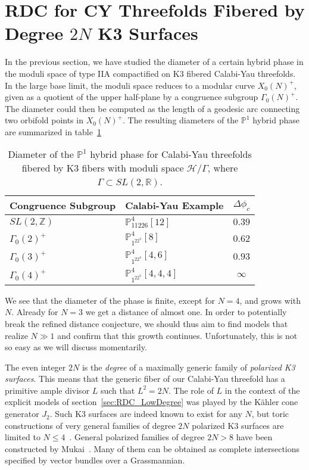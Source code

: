 \documentclass[11pt,a4paper]{article}
\numberwithin{equation}{section}
\numberwithin{table}{section}\setlength{\multlinegap}{25pt}
\begin{document}
\section{RDC for CY Threefolds Fibered by Degree \texorpdfstring{$2N$}{2N} K3 Surfaces}
\label{sec:PolarizedK3Fibrations}

In the previous section, we have studied the diameter of a certain hybrid phase in the moduli space of type IIA compactified on K3 fibered Calabi-Yau threefolds. In the large base limit, the moduli space reduces to a modular curve $X_0(N)^+$, given as a quotient of the upper half-plane by a congruence subgroup $\Gamma_0(N)^+$. The diameter could then be computed as the length of a geodesic arc connecting two orbifold points in $X_0(N)^+$. The resulting diameters of the $\mathbb{P}^1$ hybrid phase are summarized in table~\ref{tab:FiniteDistances1to4}
\begin{table}
    \renewcommand{\arraystretch}{1.3}
    \centering
    \begin{tabular}{llc}
        \toprule
        Congruence Subgroup & Calabi-Yau Example & $\Delta\phi_c$\\
        \midrule
        $SL(2,\mathbb{Z})$ & $\mathbb{P}^4_{11226}[12]$ & $0.39$\\
        $\Gamma_0(2)^+$ & $\mathbb{P}^4_{1^22^3}[8]$ & $0.62$\\
        $\Gamma_0(3)^+$ & $\mathbb{P}^4_{1^22^4}[4,6]$ & $0.93$\\
        $\Gamma_0(4)^+$ & $\mathbb{P}^4_{1^22^5}[4,4,4]$ & $\infty$\\
        \bottomrule
    \end{tabular}
    \caption{Diameter of the $\mathbb{P}^1$ hybrid phase for Calabi-Yau threefolds fibered by K3 fibers with moduli space $\mathcal{H}/\Gamma$, where $\Gamma\subset SL(2,\mathbb{R})$.}
    \label{tab:FiniteDistances1to4}
\end{table}
We see that the diameter of the phase is finite, except for $N=4$, and grows with $N$. Already for $N=3$ we get a distance of almost one. In order to potentially break the refined distance conjecture, we should thus aim to find models that realize $N\gg 1$ and confirm that this growth continues. Unfortunately, this is not so easy as we will discuss momentarily.

The even integer $2N$ is the \emph{degree} of a maximally generic family of \emph{polarized K3 surfaces}. This means that the generic fiber of our Calabi-Yau threefold has a primitive ample divisor $L$ such that $L^2=2N$. The role of $L$ in the context of the explicit models of section~\ref{sec:RDC_LowDegree} was played by the Kähler cone generator $J_2$. Such K3 surfaces are indeed known to exist for any $N$, but toric constructions of very general families of degree $2N$ polarized K3 surfaces are limited to $N\leq 4$~\cite{Huybrechts:2016uxh}. General polarized families of degree $2N>8$ have been constructed by Mukai~\cite{Mukai1,Mukai2,Mukai3,Mukai4,Mukai5,Mukai6}. Many of them can be obtained as complete intersections specified by vector bundles over a Grassmannian.
\end{document}
